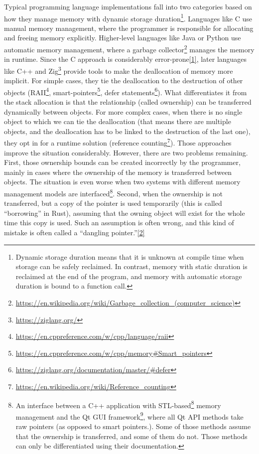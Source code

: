\documentclass[
  11pt,
  twoside,symmetric]{report}
\DeclareRobustCommand{\href}[2]{#2\footnote{\url{#1}}}
\begin{document}
Typical programming language implementations fall into two categories
based on how they manage memory with dynamic storage
duration\footnote{Dynamic storage duration means that it is unknown at
  compile time when storage can be safely reclaimed. In contrast, memory
  with static duration is reclaimed at the end of the program, and
  memory with automatic storage duration is bound to a function call.}.
Languages like C use manual memory management, where the programmer is
responsible for allocating and freeing memory explicitly. Higher-level
languages like Java or Python use automatic memory management, where a
\href{https://en.wikipedia.org/wiki/Garbage_collection_(computer_science)}{garbage
collector} manages the memory in runtime. Since the C approach is
considerably error-prone\protect\hyperlink{ref-nsa}{{[}1{]}}, later
languages like C++ and \href{https://ziglang.org/}{Zig} provide tools to
make the deallocation of memory more implicit. For simple cases, they
tie the deallocation to the destruction of other objects
(\href{https://en.cppreference.com/w/cpp/language/raii}{RAII},
\href{https://en.cppreference.com/w/cpp/memory\#Smart_pointers}{smart-pointers},
\href{https://ziglang.org/documentation/master/\#defer}{defer
statements}). What differentiates it from the stack allocation is that
the relationship (called ownership) can be transferred dynamically
between objects. For more complex cases, when there is no single object
to which we can tie the deallocation (that means there are multiple
objects, and the deallocation has to be linked to the destruction of the
last one), they opt in for a runtime solution
(\href{https://en.wikipedia.org/wiki/Reference_counting}{reference
counting}). Those approaches improve the situation considerably.
However, there are two problems remaining. First, those ownership bounds
can be created incorrectly by the programmer, mainly in cases where the
ownership of the memory is transferred between objects. The situation is
even worse when two systems with different memory management models are
interfaced\footnote{An interface between a C++ application with
  \href{https://www.cppreference.com/Cpp_STL_ReferenceManual.pdf}{STL-based}
  memory management and the \href{https://www.qt.io/}{Qt GUI framework},
  where all Qt API methods take raw pointers (as opposed to smart
  pointers.). Some of those methods assume that the ownership is
  transferred, and some of them do not. Those methods can only be
  differentiated using their documentation.}. Second, when the ownership
is not transferred, but a copy of the pointer is used temporarily (this
is called ``borrowing'' in Rust), assuming that the owning object will
exist for the whole time this copy is used. Such an assumption is often
wrong, and this kind of mistake is often called a ``dangling
pointer.''\protect\hyperlink{ref-danglingpointer}{{[}2{]}}
\end{document}
